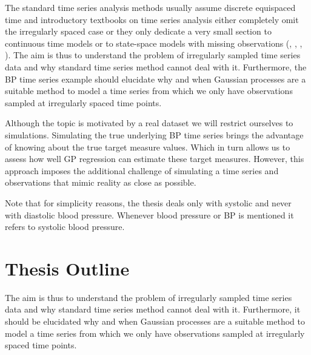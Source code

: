 The standard time series analysis methods usually assume discrete equispaced
time and introductory textbooks on time series analysis either completely omit
the irregularly spaced case or they only dedicate
a very small section to continuous time models or to state-space models
with missing observations (\citeauthor{brockwell_time_1991}, \citeauthor{brockwell_introduction_2016},
\citeauthor{cryer_time_2008}, \citeauthor{chatfield_analysis_2003}).
The aim is thus to understand the problem of irregularly sampled time series data
and why standard time series method cannot deal with it.
Furthermore, the BP time series example should elucidate why and when Gaussian processes are a
suitable method to model a time series from which we only have observations sampled at
irregularly spaced time points.

Although the topic is motivated by a real dataset we will restrict ourselves to
simulations.
Simulating the true underlying BP time series
brings the advantage of knowing about the true target measure values.
Which in turn allows us to assess how well GP regression can estimate these
target measures.
However, this approach imposes the additional challenge
of simulating a time series and observations that mimic reality as close
as possible.

Note that for simplicity reasons, the thesis deals only with systolic and never with diastolic
blood pressure.
Whenever blood pressure or BP is mentioned it refers to systolic blood pressure.


\section{Thesis Outline}

The aim is thus to understand the problem of irregularly sampled time series data
and why standard time series method cannot deal with it.
Furthermore, it should be elucidated why and when Gaussian processes are a
suitable method to model a time series from which we only have observations sampled at
irregularly spaced time points.










